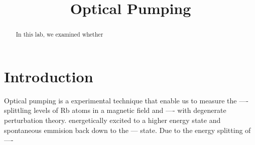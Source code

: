 \documentclass{sigchi}
\def\plaintitle{Optical Pumping}
\begin{document}
\title{\plaintitle}

\maketitle

\begin{abstract}
In this lab, we examined whether 
\end{abstract}

\section{Introduction}\label{sec:intro}
\par %
Optical pumping is a experimental technique that enable us to measure the ---- splittling levels of Rb atoms in a magnetic field and ---- with degenerate perturbation theory. 
energetically excited to a higher energy state and spontaneous emmision back down to the --- state. Due to the energy splitting of ---- 
\end{document}
